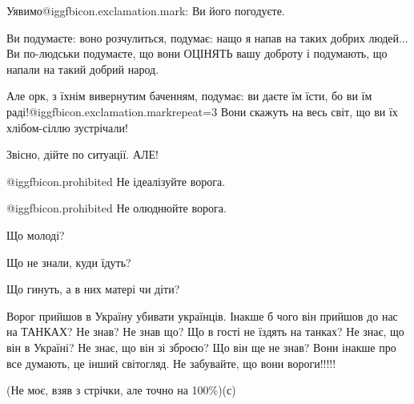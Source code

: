 Уявимо@igg{fbicon.exclamation.mark}: Ви його погодуєте.

Ви подумаєте: воно розчулиться, подумає: нащо я напав на таких добрих людей...
Ви по-людськи подумаєте, що вони ОЦІНЯТЬ вашу доброту і подумають, що напали на
такий добрий народ.

Але орк, з  їхнім вивернутим баченням, подумає: ви даєте їм їсти, бо ви їм
раді!@igg{fbicon.exclamation.mark}{repeat=3} Вони скажуть на весь світ, що ви
їх хлібом-сіллю зустрічали! 

Звісно, дійте по ситуації. АЛЕ!

@igg{fbicon.prohibited} Не ідеалізуйте ворога.

@igg{fbicon.prohibited} Не олюднюйте ворога.

Що молоді?

Що не знали, куди їдуть?

Що гинуть, а в них матері чи діти?

Ворог прийшов в Україну убивати українців. Інакше б чого він прийшов до нас на
ТАНКАХ? Не знав? Не знав що? Що в гості не їздять на танках? Не знає, що він в
Україні? Не знає, що він зі зброєю? Що він ще не знав? Вони інакше про все
думають, це інший світогляд. Не забувайте, що вони вороги!!!!!

(Не моє, взяв з стрічки, але точно на 100\%)(с)
